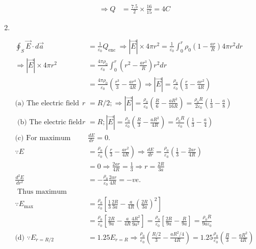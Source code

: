 \begin{enumerate}
\begin{answer}
\begin{align*}
	\Rightarrow Q&=\frac{7.5}{2} \times \frac{16}{15}=4 C
	\end{align*}
\end{answer}
\item $\left. \right. $
\begin{answer}
	\begin{align*}
\oint_{S} \vec{E} \cdot d \vec{a}&=\frac{1}{\varepsilon_{0}} Q_{\text {enc }} \Rightarrow|\vec{E}| \times 4 \pi r^{2}=\frac{1}{\varepsilon_{0}} \int_{0}^{r} \rho_{0}\left(1-\frac{a r}{R}\right) 4 \pi r^{2} d r\\
	\Rightarrow|\vec{E}| \times 4 \pi r^{2}&=\frac{4 \pi \rho_{0}}{\varepsilon_{0}} \int_{0}^{r}\left(r^{2}-\frac{a r^{3}}{R}\right) r^{2} d r\\&=\frac{4 \pi \rho_{0}}{\varepsilon_{0}}\left(\frac{r^{3}}{3}-\frac{a r^{4}}{4 R}\right) \Rightarrow|\vec{E}|=\frac{\rho_{0}}{\varepsilon_{0}}\left(\frac{r}{3}-\frac{a r^{2}}{4 R}\right)\\
	\text{(a) The electric field at }r&=R / 2 ; \Rightarrow|\vec{E}|=\frac{\rho_{0}}{\varepsilon_{0}}\left(\frac{R}{6}-\frac{a R^{2}}{16 R}\right)=\frac{\rho_{0} R}{2 \varepsilon_{0}}\left(\frac{1}{3}-\frac{a}{8}\right)\\
\text{	(b) The electric field at }r&=R ;|\vec{E}|=\frac{\rho_{0}}{\varepsilon_{0}}\left(\frac{R}{3}-\frac{a R^{2}}{4 R}\right)=\frac{\rho_{0} R}{\varepsilon_{0}}\left(\frac{1}{3}-\frac{a}{4}\right)\\
	\text{(c) For maximum electric field }&\frac{d E}{d r}=0.\\
	\because E&=\frac{\rho_{0}}{\varepsilon_{0}}\left(\frac{r}{3}-\frac{a r^{2}}{4 R}\right) \Rightarrow \frac{d E}{d r}=\frac{\rho_{0}}{\varepsilon_{0}}\left(\frac{1}{3}-\frac{2 a r}{4 R}\right)\\&=0 \Rightarrow \frac{2 a r}{4 R}=\frac{1}{3} \Rightarrow r=\frac{2 R}{3 a} \\
	\frac{d^{2} E}{d r^{2}}&=-\frac{\rho_{0}}{\varepsilon_{0}} \frac{2 a r}{4 R}=-v e .\\
\text{	Thus maximum value is}\\
	\because E_{\max }&=\frac{\rho_{0}}{\varepsilon_{0}}\left[\frac{1}{3} \frac{2 R}{3 a}-\frac{a}{4 R}\left(\frac{2 R}{3 a}\right)^{2}\right]\\&=\frac{\rho_{0}}{\varepsilon_{0}}\left[\frac{2 R}{9 a}-\frac{a}{4 R} \frac{4 R^{2}}{9 a^{2}}\right]=\frac{\rho_{0}}{\varepsilon_{0}}\left[\frac{2 R}{9 a}-\frac{R}{9 a}\right]=\frac{\rho_{0} R}{9 a \varepsilon_{0}}\\
	\text{(d) }\because E_{r=R / 2}&=1.25 E_{r=R} \Rightarrow \frac{\rho_{0}}{\varepsilon_{0}}\left(\frac{R / 2}{3}-\frac{a R^{2} / 4}{4 R}\right)=1.25 \frac{\rho_{0}}{\varepsilon_{0}}\left(\frac{R}{3}-\frac{a R^{2}}{4 R}\right)\\

\end{align*}
\end{answer}
\end{enumerate}
